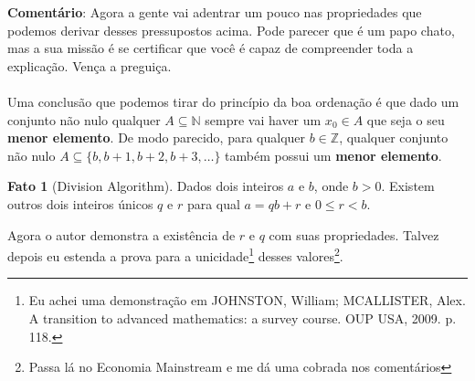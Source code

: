 \documentclass[a4paper,11pt]{book}
\theoremstyle{definition}
\theoremstyle{break}
\newtheorem{fact}{Fato}[section]
\begin{document}
\textbf{Comentário}: Agora a gente vai adentrar um pouco nas propriedades que podemos derivar desses pressupostos acima. Pode parecer que é um papo chato, mas a sua missão é se certificar que você é capaz de compreender toda a explicação. Vença a preguiça.
\\
\\
Uma conclusão que podemos tirar do princípio da boa ordenação é que dado um conjunto não nulo qualquer $A \subseteq \mathbb{N}$ sempre vai haver um $x_0 \in A$ que seja o seu \textbf{menor elemento}. De modo parecido, para qualquer $b \in \mathbb{Z}$, qualquer conjunto não nulo $A \subseteq \{ b, b+1, b+2, b+3, \dots \}$ também possui um \textbf{menor elemento}.

\begin{fact}[Division Algorithm]
Dados dois inteiros $a$ e $b$, onde $b > 0$. Existem outros dois inteiros únicos $q$ e $r$ para qual $a = qb + r$ e $0 \leq r < b$.
\end{fact}

Agora o autor demonstra a existência de $r$ e $q$ com suas propriedades. Talvez depois eu estenda a prova para a unicidade\footnote{Eu achei uma demonstração em JOHNSTON, William; MCALLISTER, Alex. A transition to advanced mathematics: a survey course. OUP USA, 2009. p. 118.} desses valores\footnote{Passa lá no Economia Mainstream e me dá uma cobrada nos comentários}.
\end{document}
